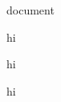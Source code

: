 \documentclass[oneside]{article}[12pt]
\title{}
\author{}
\date{}
\begin{document}
\maketitle
  document

  hi

  hi

  hi
\end{document}

